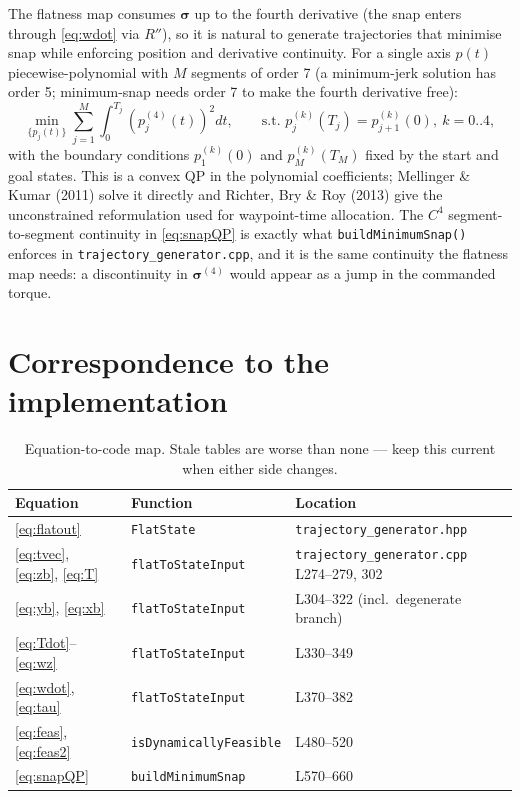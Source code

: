 \documentclass[11pt]{article}
\begin{document}
The flatness map consumes $\bm\sigma$ up to the fourth derivative (the snap enters through
\eqref{eq:wdot} via $R''$), so it is natural to generate trajectories that minimise snap
while enforcing position and derivative continuity. For a single axis $p(t)$
piecewise-polynomial with $M$ segments of order 7 (a minimum-jerk solution has order 5;
minimum-snap needs order 7 to make the fourth derivative free):
\begin{equation}
  \min_{\{p_j(t)\}} \sum_{j=1}^{M} \int_0^{T_j} \left( p_j^{(4)}(t) \right)^2 dt,
  \qquad
  \text{s.t. } p_j^{(k)}(T_j) = p_{j+1}^{(k)}(0),\ k = 0..4,
  \label{eq:snapQP}
\end{equation}
with the boundary conditions $p_1^{(k)}(0)$ and $p_M^{(k)}(T_M)$ fixed by the start and goal
states. This is a convex QP in the polynomial coefficients; Mellinger \& Kumar (2011) solve
it directly and Richter, Bry \& Roy (2013) give the unconstrained reformulation used for
waypoint-time allocation. The $C^4$ segment-to-segment continuity in
\eqref{eq:snapQP} is exactly what \texttt{buildMinimumSnap()} enforces in
\texttt{trajectory\_generator.cpp}, and it is the same continuity the flatness map needs:
a discontinuity in $\bm\sigma^{(4)}$ would appear as a jump in the commanded torque.

\section{Correspondence to the implementation}
\label{sec:table}

\begin{table}[h]
\centering
\caption{Equation-to-code map. Stale tables are worse than none — keep this current when
either side changes.}
\label{tab:flatmap}
\begin{tabular}{@{}llp{7cm}@{}}
\toprule
Equation & Function & Location \\
\midrule
\eqref{eq:flatout} & \texttt{FlatState} & \texttt{trajectory\_generator.hpp} \\
\eqref{eq:tvec}, \eqref{eq:zb}, \eqref{eq:T} & \texttt{flatToStateInput} & \texttt{trajectory\_generator.cpp} L274--279, 302 \\
\eqref{eq:yb}, \eqref{eq:xb} & \texttt{flatToStateInput} & L304--322 (incl.\ degenerate branch) \\
\eqref{eq:Tdot}--\eqref{eq:wz} & \texttt{flatToStateInput} & L330--349 \\
\eqref{eq:wdot}, \eqref{eq:tau} & \texttt{flatToStateInput} & L370--382 \\
\eqref{eq:feas}, \eqref{eq:feas2} & \texttt{isDynamicallyFeasible} & L480--520 \\
\eqref{eq:snapQP} & \texttt{buildMinimumSnap} & L570--660 \\
\bottomrule
\end{tabular}
\end{table}
\end{document}
